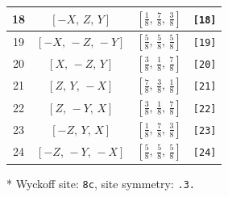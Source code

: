\documentclass[fleqn,8pt]{jsarticle}
\begin{document}
\begin{longtable}{cccc}
18 & $\left[ - X,\, Z,\, Y \right]$ & $\left[ \frac{1}{8},\, \frac{7}{8},\, \frac{3}{8} \right]$ & {\tt [18]} \\ \hline
19 & $\left[ - X,\, - Z,\, - Y \right]$ & $\left[ \frac{5}{8},\, \frac{5}{8},\, \frac{5}{8} \right]$ & {\tt [19]} \\ \hline
20 & $\left[ X,\, - Z,\, Y \right]$ & $\left[ \frac{3}{8},\, \frac{1}{8},\, \frac{7}{8} \right]$ & {\tt [20]} \\ \hline
21 & $\left[ Z,\, Y,\, - X \right]$ & $\left[ \frac{7}{8},\, \frac{3}{8},\, \frac{1}{8} \right]$ & {\tt [21]} \\ \hline
22 & $\left[ Z,\, - Y,\, X \right]$ & $\left[ \frac{3}{8},\, \frac{1}{8},\, \frac{7}{8} \right]$ & {\tt [22]} \\ \hline
23 & $\left[ - Z,\, Y,\, X \right]$ & $\left[ \frac{1}{8},\, \frac{7}{8},\, \frac{3}{8} \right]$ & {\tt [23]} \\ \hline
24 & $\left[ - Z,\, - Y,\, - X \right]$ & $\left[ \frac{5}{8},\, \frac{5}{8},\, \frac{5}{8} \right]$ & {\tt [24]} \\
\end{longtable}
* Wyckoff site: {\tt 8c}, site symmetry: {\tt .3.}
\renewcommand{\arraystretch}{1.2}
\end{document}
